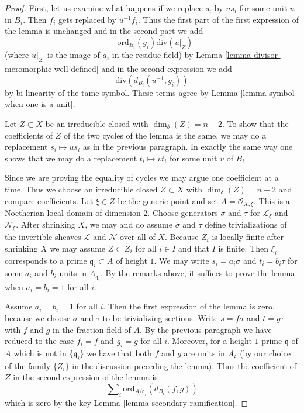 \begin{proof}
First, let us examine what happens if we replace $s_i$ by $us_i$
for some unit $u$ in $B_i$. Then $f_i$ gets replaced by $u^{-1} f_i$.
Thus the first part of the first expression of the lemma is unchanged
and in the second part we add
$$
-\text{ord}_{B_i}(g_i)\text{div}(u|_Z)
$$
(where $u|_{Z_i}$ is the image of $a_i$ in the residue field) by
Lemma \ref{lemma-divisor-meromorphic-well-defined}
and in the second expression we add
$$
\text{div}(d_{B_i}(u^{-1}, g_i))
$$
by bi-linearity of the tame symbol. These terms agree by
Lemma \ref{lemma-symbol-when-one-is-a-unit}.

\medskip\noindent
Let $Z \subset X$ be an irreducible closed with $\dim_\delta(Z) = n - 2$.
To show that the coefficients of $Z$ of the two cycles of the lemma
is the same, we may do a replacement $s_i \mapsto us_i$ as in the previous
paragraph. In exactly the same way one shows that we may do a replacement
$t_i \mapsto vt_i$ for some unit $v$ of $B_i$.

\medskip\noindent
Since we are proving the equality of cycles we may argue one coefficient
at a time. Thus we choose an irreducible closed $Z \subset X$
with $\dim_\delta(Z) = n - 2$ and compare coefficients. Let $\xi \in Z$
be the generic point and set $A = \mathcal{O}_{X, \xi}$. This is a Noetherian
local domain of dimension $2$. Choose generators $\sigma$ and $\tau$
for $\mathcal{L}_\xi$ and $\mathcal{N}_\xi$. After shrinking $X$, we may
and do assume $\sigma$ and $\tau$ define trivializations
of the invertible sheaves $\mathcal{L}$ and $\mathcal{N}$ over all of $X$.
Because $Z_i$ is locally
finite after shrinking $X$ we may assume $Z \subset Z_i$ for all $i \in I$
and that $I$ is finite. Then $\xi_i$ corresponds to a prime
$\mathfrak q_i \subset A$ of height $1$.
We may write $s_i = a_i \sigma$ and $t_i = b_i \tau$
for some $a_i$ and $b_i$ units in $A_{\mathfrak q_i}$.
By the remarks above, it suffices to prove the lemma when
$a_i = b_i = 1$ for all $i$.

\medskip\noindent
Assume $a_i = b_i = 1$ for all $i$. Then the first expression of the
lemma is zero, because we choose $\sigma$ and $\tau$ to be trivializing
sections. Write $s = f\sigma$ and $t = g \tau$ with $f$ and $g$ in the
fraction field of $A$. By the previous paragraph we have reduced to the case
$f_i = f$ and $g_i = g$ for all $i$. Moreover, for a height $1$ prime
$\mathfrak q$ of $A$ which is not in $\{\mathfrak q_i\}$ we have
that both $f$ and $g$ are units in $A_\mathfrak q$ (by our choice of
the family $\{Z_i\}$ in the discussion preceding the lemma). Thus
the coefficient of $Z$ in the second expression of the lemma is
$$
\sum\nolimits_i \text{ord}_{A/\mathfrak q_i}(d_{B_i}(f, g))
$$
which is zero by the key Lemma \ref{lemma-secondary-ramification}.
\end{proof}






